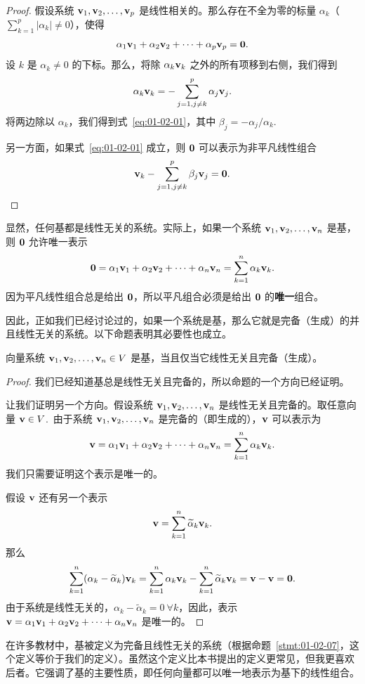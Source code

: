 \begin{proof}
 假设系统 $\mathbf{v}_1, \mathbf{v}_2, \dots, \mathbf{v}_p$ 是线性相关的。那么存在不全为零的标量 $\alpha_k$（$\sum_{k=1}^p |\alpha_k| \neq 0$），使得
$$\alpha_1 \mathbf{v}_1 + \alpha_2 \mathbf{v}_2 + \dots + \alpha_p \mathbf{v}_p = \mathbf{0}.$$
设 $k$ 是 $\alpha_k \neq 0$ 的下标。那么，将除 $\alpha_k \mathbf{v}_k$ 之外的所有项移到右侧，我们得到 $$\alpha_k \mathbf{v}_k = -\sum_{j=1, j \neq k}^p \alpha_j \mathbf{v}_j.$$
将两边除以 $\alpha_k$，我们得到式~\eqref{eq:01-02-01}，其中 $\beta_j = -\alpha_j / \alpha_k$.

另一方面，如果式~\eqref{eq:01-02-01} 成立，则 $\mathbf{0}$ 可以表示为非平凡线性组合
$$\mathbf{v}_k - \sum_{j=1, j \neq k}^p \beta_j \mathbf{v}_j = \mathbf{0}.$$\end{proof}


显然，任何基都是线性无关的系统。实际上，如果一个系统 $\mathbf{v}_1, \mathbf{v}_2, \dots, \mathbf{v}_n$ 是基，则 $\mathbf{0}$ 允许唯一表示
$$\mathbf{0} = \alpha_1 \mathbf{v}_1 + \alpha_2 \mathbf{v}_2 + \dots + \alpha_n \mathbf{v}_n = \sum_{k=1}^n \alpha_k \mathbf{v}_k.$$
因为平凡线性组合总是给出 $\mathbf{0}$，所以平凡组合必须是给出 $\mathbf{0}$ 的\textbf{唯一}组合。

因此，正如我们已经讨论过的，如果一个系统是基，那么它就是完备（生成）的并且线性无关的系统。以下命题表明其必要性也成立。

\begin{proposition}\label{stmt:01-02-07}
向量系统 $\mathbf{v}_1, \mathbf{v}_2, \dots, \mathbf{v}_n \in V$ 是基，当且仅当它线性无关且完备（生成）。
\end{proposition}

\begin{proof}
我们已经知道基总是线性无关且完备的，所以命题的一个方向已经证明。

让我们证明另一个方向。假设系统 $\mathbf{v}_1, \mathbf{v}_2, \dots, \mathbf{v}_n$ 是线性无关且完备的。取任意向量 $\mathbf{v} \in V$.~由于系统 $\mathbf{v}_1, \mathbf{v}_2, \dots, \mathbf{v}_n$ 是完备的（即生成的），$\mathbf{v}$ 可以表示为
$$\mathbf{v} = \alpha_1 \mathbf{v}_1 + \alpha_2 \mathbf{v}_2 + \dots + \alpha_n \mathbf{v}_n = \sum_{k=1}^n \alpha_k \mathbf{v}_k.$$
我们只需要证明这个表示是唯一的。

假设 $\mathbf{v}$ 还有另一个表示 $$\mathbf{v} = \sum_{k=1}^n \widetilde{\alpha}_k \mathbf{v}_k.$$
那么
$$\sum_{k=1}^n (\alpha_k - \widetilde{\alpha}_k) \mathbf{v}_k = \sum_{k=1}^n \alpha_k \mathbf{v}_k - \sum_{k=1}^n \widetilde{\alpha}_k \mathbf{v}_k = \mathbf{v} - \mathbf{v} = \mathbf{0}.$$
由于系统是线性无关的，$\alpha_k - \widetilde{\alpha}_k = 0 \ \forall k$，因此，表示 $\mathbf{v} = \alpha_1 \mathbf{v}_1 + \alpha_2 \mathbf{v}_2 + \dots + \alpha_n \mathbf{v}_n$ 是唯一的。\end{proof}

\begin{remark*}
在许多教材中，基被定义为完备且线性无关的系统（根据命题~\ref{stmt:01-02-07}，这个定义等价于我们的定义）。虽然这个定义比本书提出的定义更常见，但我更喜欢后者。它强调了基的主要性质，即任何向量都可以唯一地表示为基下的线性组合。
\end{remark*}

